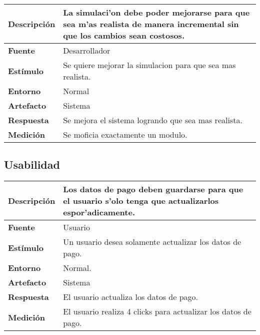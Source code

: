 \begin{center}
  \begin{tabular}{| l | p{10cm} | }
    \hline
  \textbf{Descripción} & La simulaci'on debe poder mejorarse para que sea m'as realista de manera incremental sin que los cambios sean costosos.\\  \hline
  \textbf{Fuente} & Desarrollador\\  \hline
  \textbf{Estímulo} & Se quiere mejorar la simulacion para que sea mas realista.\\  \hline
  \textbf{Entorno} & Normal\\  \hline
  \textbf{Artefacto} & Sistema\\  \hline
  \textbf{Respuesta} & Se mejora el sistema logrando que sea mas realista. \\  \hline
  \textbf{Medición} & Se moficia exactamente un modulo. \\  \hline
  \end{tabular}
\end{center} 



\subsection{Usabilidad}

\begin{center}
  \begin{tabular}{| l | p{10cm} | }
    \hline
  \textbf{Descripción} & Los datos de pago deben guardarse para que el usuario s'olo tenga que actualizarlos espor'adicamente.\\  \hline
  \textbf{Fuente} & Usuario\\  \hline
  \textbf{Estímulo} & Un usuario desea solamente actualizar los datos de pago.\\  \hline
  \textbf{Entorno} & Normal.\\  \hline
  \textbf{Artefacto} & Sistema\\  \hline
  \textbf{Respuesta} & El usuario actualiza los datos de pago.\\  \hline
  \textbf{Medición} & El usuario realiza 4 clicks para actualizar los datos de pago.\\  \hline
  \end{tabular}
\end{center} 


